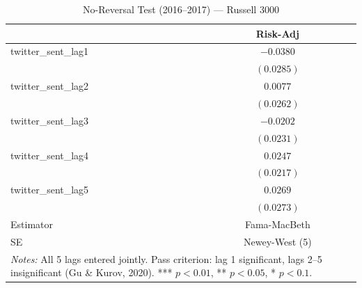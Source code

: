 \begin{table}[htbp]
\centering
\caption{No-Reversal Test (2016--2017) --- Russell 3000}
\label{tab:russel_2016_t3}
\begin{tabular}{lc}
\hline\hline
 & Risk-Adj \\
\hline
twitter\_sent\_lag1 & $-0.0380$ \\
               & $(0.0285)$ \\
twitter\_sent\_lag2 & $0.0077$ \\
               & $(0.0262)$ \\
twitter\_sent\_lag3 & $-0.0202$ \\
               & $(0.0231)$ \\
twitter\_sent\_lag4 & $0.0247$ \\
               & $(0.0217)$ \\
twitter\_sent\_lag5 & $0.0269$ \\
               & $(0.0273)$ \\
\hline
Estimator & Fama-MacBeth \\
SE & Newey-West (5) \\
\hline\hline
\multicolumn{2}{p{0.85\linewidth}}{\footnotesize \textit{Notes:} All 5 lags entered jointly. Pass criterion: lag 1 significant, lags 2--5 insignificant (Gu \& Kurov, 2020). *** $p<0.01$, ** $p<0.05$, * $p<0.1$.}\n\end{tabular}
\end{table}